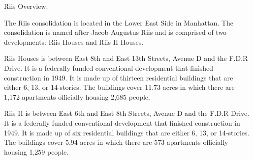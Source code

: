Riis Overview:



The Riis consolidation is located in the Lower East Side in Manhattan. The consolidation is named after Jacob Augustus Riis and is comprised of two developments: Riis Houses and Riis II Houses.



Riis Houses is between East 8th and East 13th Streets, Avenue D and the F.D.R Drive. It is a federally funded conventional development that finished construction in 1949. It is made up of thirteen residential buildings that are either 6, 13, or 14-stories. The buildings cover 11.73 acres in which there are 1,172 apartments officially housing 2,685 people. 



Riis II is between East 6th and East 8th Streets, Avenue D and the F.D.R Drive. It is a federally funded conventional development that finished construction in 1949. It is made up of six residential buildings that are either 6, 13, or 14-stories. The buildings cover 5.94 acres in which there are 573 apartments officially housing 1,259 people.